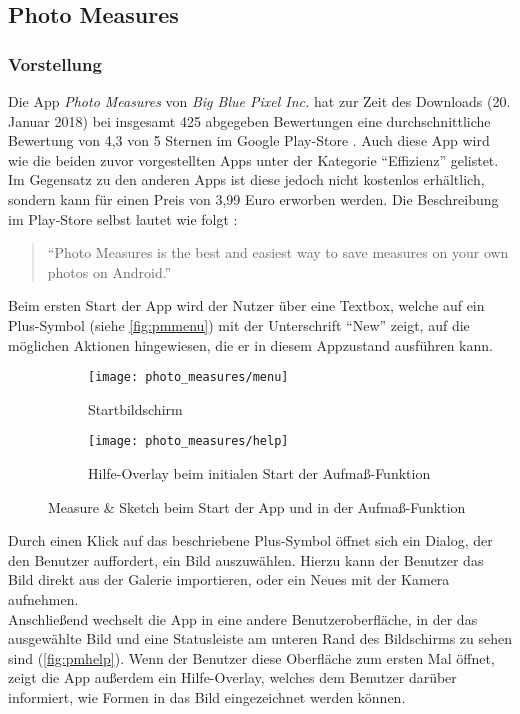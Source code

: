 \subsection{Photo Measures}

\subsubsection{Vorstellung}
Die App \emph{Photo Measures} von \emph{Big Blue Pixel Inc.} hat zur Zeit des Downloads (20. Januar 2018) bei insgesamt 425 abgegeben Bewertungen eine durchschnittliche Bewertung von 4,3 von 5 Sternen im Google Play-Store \citep{PixelPM}.
Auch diese App wird wie die beiden zuvor vorgestellten Apps unter der Kategorie ``Effizienz'' gelistet.
Im Gegensatz zu den anderen Apps ist diese jedoch nicht kostenlos erhältlich, sondern kann für einen Preis von 3,99 Euro erworben werden.  
Die Beschreibung im Play-Store selbst lautet wie folgt :

\begin{quote}
  ``Photo Measures is the best and easiest way to save measures on your own photos on Android.''
\end{quote}

\noindent
Beim ersten Start der App wird der Nutzer über eine Textbox, welche auf ein Plus-Symbol (siehe \autoref{fig:pmmenu}) mit der Unterschrift ``New'' zeigt, auf die möglichen Aktionen hingewiesen, die er in diesem Appzustand ausführen kann.

\begin{figure}[h]
  \centering
	\begin{subfigure}[t]{0.4\textwidth}
		\texttt{[image: photo\_measures/menu]}
		\caption{Startbildschirm}
		\label{fig:pmmenu}	
	\end{subfigure}
	\begin{subfigure}[t]{0.4\textwidth}
		\texttt{[image: photo\_measures/help]}
		\caption{Hilfe-Overlay beim initialen Start der Aufmaß-Funktion} 
		\label{fig:pmhelp}	
	\end{subfigure}
  \caption{Measure \& Sketch beim Start der App und in der Aufmaß-Funktion}
\end{figure}

\noindent
Durch einen Klick auf das beschriebene Plus-Symbol öffnet sich ein Dialog, der den Benutzer auffordert, ein Bild auszuwählen.
Hierzu kann der Benutzer das Bild direkt aus der Galerie importieren, oder ein Neues mit der Kamera aufnehmen. \\
Anschließend wechselt die App in eine andere Benutzeroberfläche, in der das ausgewählte Bild und eine Statusleiste am unteren Rand des Bildschirms zu sehen sind (\autoref{fig:pmhelp}).
Wenn der Benutzer diese Oberfläche zum ersten Mal öffnet, zeigt die App außerdem ein Hilfe-Overlay, welches dem Benutzer darüber informiert, wie Formen in das Bild eingezeichnet werden können.  \\

